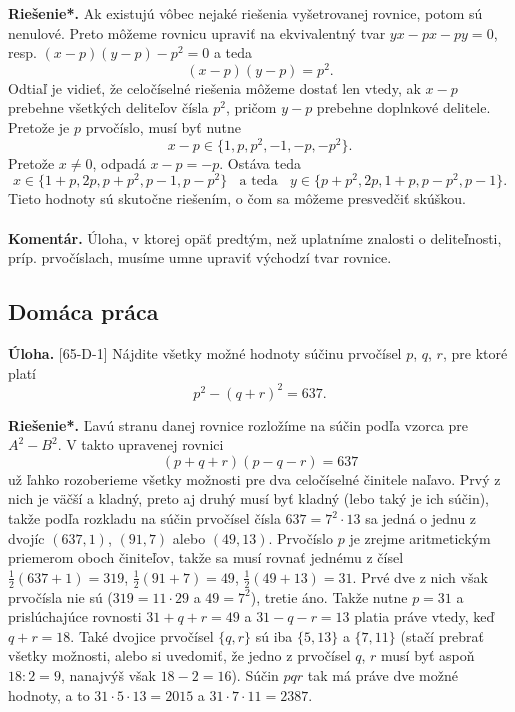 \documentclass[11pt,a4paper,oneside,final]{book}
\newcommand{\kom}{\textbf{Komentár.} }
\newcommand{\ul}{\textbf{Úloha.} }
\newcommand{\rieh}{\textbf{Riešenie*.} }
\begin{document}
\rieh Ak existujú vôbec nejaké riešenia vyšetrovanej rovnice, potom sú nenulové. Preto môžeme rovnicu upraviť na ekvivalentný tvar $yx-px-py=0$, resp. $(x-p)(y-p)-p^2=0$ a teda $$(x-p)(y-p)=p^2.$$ Odtiaľ je vidieť, že celočíselné riešenia môžeme dostať len vtedy, ak $x-p$ prebehne všetkých deliteľov čísla $p^2$, pričom $y-p$ prebehne doplnkové delitele. Pretože je $p$ prvočíslo, musí byť nutne $$x-p \in \{1, p, p^2, -1, -p, -p^2\}.$$ Pretože $x\neq 0$, odpadá $x-p=-p$. Ostáva teda $$x \in \{1+p, 2p, p+p^2, p-1, p-p^2\} \ \ \ \ \text{a teda} \ \ \ \ y \in \{p+p^2, 2p, 1+p, p-p^2, p-1\}.$$ Tieto hodnoty sú skutočne riešením, o čom sa môžeme presvedčiť skúškou.\\
\\
\kom Úloha, v ktorej opäť predtým, než uplatníme znalosti o deliteľnosti, príp. prvočíslach, musíme umne upraviť východzí tvar rovnice.


\subsection*{Domáca práca}

\begin{tcolorbox}[breakable,notitle,boxrule=0pt,colback=light-gray,colframe=light-gray]\ul [65-D-1]
Nájdite všetky možné hodnoty súčinu prvočísel $p$, $q$, $r$, pre ktoré platí
$$p^2 - (q + r)^2= 637.$$

\end{tcolorbox}

\rieh Ľavú stranu danej rovnice rozložíme na súčin podľa vzorca pre $A^2 - B^2$. V takto upravenej rovnici
$$(p + q + r)(p - q - r) = 637$$
už ľahko rozoberieme všetky možnosti pre dva celočíselné činitele naľavo. Prvý z nich je väčší a kladný, preto aj druhý musí byť kladný (lebo taký je ich súčin), takže podľa rozkladu na súčin prvočísel čísla $637 = 7^2 \cdot 13$ sa jedná o jednu z dvojíc $(637, 1)$, $(91, 7)$
alebo $(49, 13)$. Prvočíslo $p$ je zrejme aritmetickým priemerom oboch činiteľov, takže sa musí rovnať jednému z čísel $\frac{1}{2}(637 + 1) = 319$, $\frac{1}{2}(91 + 7) = 49$, $\frac{1}{2}(49 + 13) = 31$. Prvé dve z nich však prvočísla nie sú ($319 = 11 \cdot  29$ a $49 = 7^2$), tretie áno. Takže nutne $p = 31$ a prislúchajúce rovnosti $31 + q + r = 49$ a $31 - q - r = 13$ platia práve vtedy, keď $q + r = 18$. Také dvojice prvočísel $\{q, r\}$ sú iba $\{5, 13\}$ a $\{7, 11\}$ (stačí prebrať
všetky možnosti, alebo si uvedomiť, že jedno z prvočísel $q$, $r$ musí byť aspoň $18 : 2 = 9$, nanajvýš však $18 - 2 = 16$). Súčin $pqr$ tak má práve dve možné hodnoty, a to $31 \cdot  5\cdot  13 = 2 015$ a $31 \cdot  7 \cdot  11 = 2 387$.\\
\\
\end{document}

